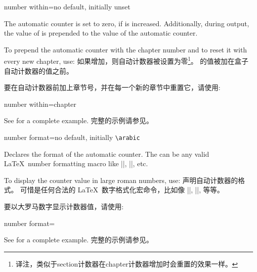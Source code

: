 \begin{newTcbKey}{number within}{=}{no default, initially unset}
\begin{stripedbox}
The automatic counter is set to zero, if  is increased.
Additionally, during output, 
the value of  is prepended to the value of the automatic counter.\par
To prepend the automatic counter with the chapter number and to reset it with every new chapter, use:
\tcblower
如果增加，则自动计数器被设置为零\footnote{译注，类似于section计数器在chapter计数器增加时会重置的效果一样。}。
的值被加在盒子自动计数器的值之前。\par
要在自动计数器前加上章节号，并在每一个新的章节中重置它，请使用:
\end{stripedbox}

\begin{dispListing}
number within=chapter
\end{dispListing}
\begin{stripedbox}
See  for a complete example.
\tcblower
完整的示例请参见。
\end{stripedbox}
\end{newTcbKey}


\begin{newTcbKey}{number format}{=}{no default, initially \texttt{\textbackslash arabic}}
\begin{stripedbox}
Declares the format of the automatic counter. 
The  can be any valid \LaTeX\ number formatting macro like |\arabic|, |\roman|, etc.\par
To display the counter value in large roman numbers, use:
\tcblower
声明自动计数器的格式。%
可惜是任何合法的 \LaTeX\ 数字格式化宏命令，比如像 |\arabic|, |\roman|, 等等。\par
要以大罗马数字显示计数器值，请使用:
\end{stripedbox}

\begin{dispListing}
number format=\Roman
\end{dispListing}
\begin{stripedbox}
See  for a complete example.
\tcblower
完整的示例请参见。
\end{stripedbox}
\end{newTcbKey}

